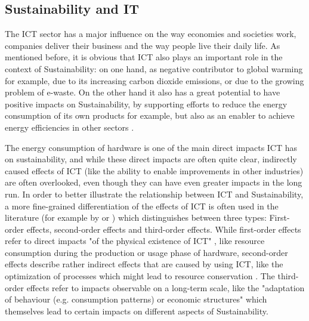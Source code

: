 \subsection{Sustainability and IT}
The ICT sector has a major influence on the way economies and societies work, companies deliver their business and the way people live their daily life. As mentioned before, it is obvious that ICT also plays an important role in the context of Sustainability: on one hand, as negative contributor to global warming for example, due to its increasing carbon dioxide emissions, %
 or due to the growing problem of e-waste. %
 On the other hand it also has a great potential to have positive impacts on Sustainability, by supporting efforts to reduce the energy consumption of its own products for example, but also as an enabler to achieve energy efficiencies in other sectors \cite{smart2020}. %

The energy consumption of hardware is one of the main direct impacts ICT has on sustainability, and while these direct impacts are often quite clear, indirectly caused effects of ICT (like the ability to enable improvements in other industries) are often overlooked, even though they can have even greater impacts in the long run. In order to better illustrate the relationship between ICT and Sustainability, a more fine-grained differentiation of the effects of ICT is often used in the literature (for example by \cite{hilty_relevance_2006} or \cite{naumann_greensoft_2011}) which distinguishes between three types: First-order effects, second-order effects and third-order effects. %
While first-order effects refer to direct impacts "of the physical existence of ICT" \cite{hilty_relevance_2006}, like resource consumption during the production or usage phase of hardware, second-order effects describe rather indirect effects that are caused by using ICT, like the optimization of processes which might lead to resource conservation \cite{naumann_greensoft_2011}. The third-order effects refer to impacts observable on a long-term scale, like the "adaptation of behaviour (e.g. consumption patterns) or economic structures" \cite{hilty_relevance_2006} which themselves lead to certain impacts on different aspects of Sustainability.  %


